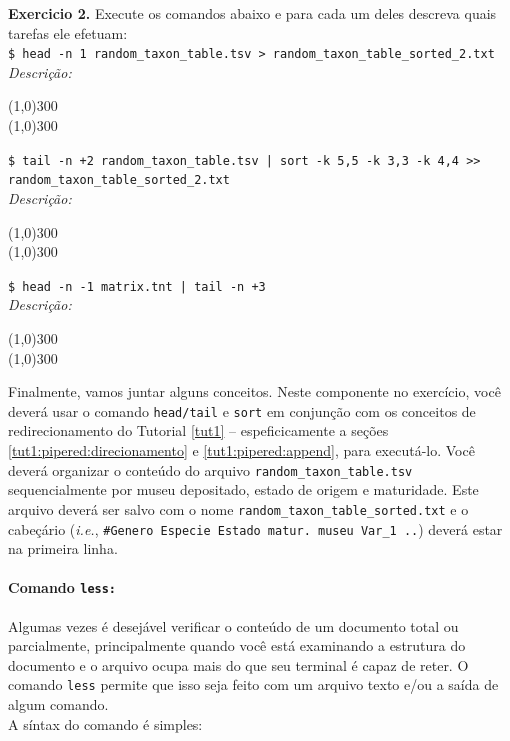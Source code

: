 \begin{refsection}
\begin{blackBlock}{\textbf{Exercicio 2.}}
Execute os comandos abaixo e para cada um deles descreva quais tarefas ele efetuam:\\
 
\small{\texttt{\$ head -n 1 random\_taxon\_table.tsv > random\_taxon\_table\_sorted\_2.txt}}\\

\textit{Descrição:}
\begin{center}
\line(1,0){300}\\
\line(1,0){300}\\
\end{center}

\texttt{\$ tail -n +2 random\_taxon\_table.tsv | sort -k 5,5 -k 3,3 -k 4,4 >> random\_taxon\_table\_sorted\_2.txt}
\\
\textit{Descrição:}
\begin{center}
\line(1,0){300}\\
\line(1,0){300}\\
\end{center}

\texttt{\$ head -n -1 matrix.tnt | tail -n +3}
\\
\textit{Descrição:}
\begin{center}
\line(1,0){300}\\
\line(1,0){300}\\
\end{center}

Finalmente, vamos juntar alguns conceitos. Neste componente no exercício, você deverá usar o comando \texttt{head/tail} e \texttt{sort} em conjunção com os conceitos de redirecionamento do Tutorial \ref{tut1} -- espeficicamente a seções \ref{tut1:pipered:direcionamento} e \ref{tut1:pipered:append}, para executá-lo. Você deverá organizar o conteúdo do arquivo \texttt{random\_taxon\_table.tsv} sequencialmente por museu depositado, estado de origem e maturidade. Este arquivo deverá ser salvo com o nome \texttt{random\_taxon\_table\_sorted.txt} e o cabeçário (\textit{i.e.}, \texttt{\#Genero Especie Estado matur. museu Var\_1 ..}) deverá estar na primeira linha.

\end{blackBlock}

\paragraph{Comando \texttt{less:}}\label{tut2:text:editors:texttools:less}
	Algumas vezes é desejável verificar o conteúdo de um documento total ou parcialmente, principalmente quando você está examinando a estrutura do documento e o arquivo ocupa mais do que seu terminal é capaz de reter. O comando \texttt{less} permite que isso seja feito com um arquivo texto e/ou a saída de algum comando.\\
A síntax do comando é simples:\\


\end{refsection}
